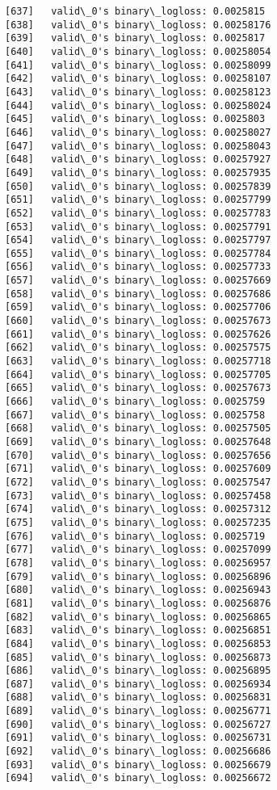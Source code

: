 \documentclass[11pt]{article}
\begin{document}
\begin{Verbatim}[commandchars=\\\{\}]
[637]	valid\_0's binary\_logloss: 0.0025815
[638]	valid\_0's binary\_logloss: 0.00258176
[639]	valid\_0's binary\_logloss: 0.0025817
[640]	valid\_0's binary\_logloss: 0.00258054
[641]	valid\_0's binary\_logloss: 0.00258099
[642]	valid\_0's binary\_logloss: 0.00258107
[643]	valid\_0's binary\_logloss: 0.00258123
[644]	valid\_0's binary\_logloss: 0.00258024
[645]	valid\_0's binary\_logloss: 0.0025803
[646]	valid\_0's binary\_logloss: 0.00258027
[647]	valid\_0's binary\_logloss: 0.00258043
[648]	valid\_0's binary\_logloss: 0.00257927
[649]	valid\_0's binary\_logloss: 0.00257935
[650]	valid\_0's binary\_logloss: 0.00257839
[651]	valid\_0's binary\_logloss: 0.00257799
[652]	valid\_0's binary\_logloss: 0.00257783
[653]	valid\_0's binary\_logloss: 0.00257791
[654]	valid\_0's binary\_logloss: 0.00257797
[655]	valid\_0's binary\_logloss: 0.00257784
[656]	valid\_0's binary\_logloss: 0.00257733
[657]	valid\_0's binary\_logloss: 0.00257669
[658]	valid\_0's binary\_logloss: 0.00257686
[659]	valid\_0's binary\_logloss: 0.00257706
[660]	valid\_0's binary\_logloss: 0.00257673
[661]	valid\_0's binary\_logloss: 0.00257626
[662]	valid\_0's binary\_logloss: 0.00257575
[663]	valid\_0's binary\_logloss: 0.00257718
[664]	valid\_0's binary\_logloss: 0.00257705
[665]	valid\_0's binary\_logloss: 0.00257673
[666]	valid\_0's binary\_logloss: 0.0025759
[667]	valid\_0's binary\_logloss: 0.0025758
[668]	valid\_0's binary\_logloss: 0.00257505
[669]	valid\_0's binary\_logloss: 0.00257648
[670]	valid\_0's binary\_logloss: 0.00257656
[671]	valid\_0's binary\_logloss: 0.00257609
[672]	valid\_0's binary\_logloss: 0.00257547
[673]	valid\_0's binary\_logloss: 0.00257458
[674]	valid\_0's binary\_logloss: 0.00257312
[675]	valid\_0's binary\_logloss: 0.00257235
[676]	valid\_0's binary\_logloss: 0.0025719
[677]	valid\_0's binary\_logloss: 0.00257099
[678]	valid\_0's binary\_logloss: 0.00256957
[679]	valid\_0's binary\_logloss: 0.00256896
[680]	valid\_0's binary\_logloss: 0.00256943
[681]	valid\_0's binary\_logloss: 0.00256876
[682]	valid\_0's binary\_logloss: 0.00256865
[683]	valid\_0's binary\_logloss: 0.00256851
[684]	valid\_0's binary\_logloss: 0.00256853
[685]	valid\_0's binary\_logloss: 0.00256873
[686]	valid\_0's binary\_logloss: 0.00256895
[687]	valid\_0's binary\_logloss: 0.00256934
[688]	valid\_0's binary\_logloss: 0.00256831
[689]	valid\_0's binary\_logloss: 0.00256771
[690]	valid\_0's binary\_logloss: 0.00256727
[691]	valid\_0's binary\_logloss: 0.00256731
[692]	valid\_0's binary\_logloss: 0.00256686
[693]	valid\_0's binary\_logloss: 0.00256679
[694]	valid\_0's binary\_logloss: 0.00256672

\end{Verbatim}
\end{document}
